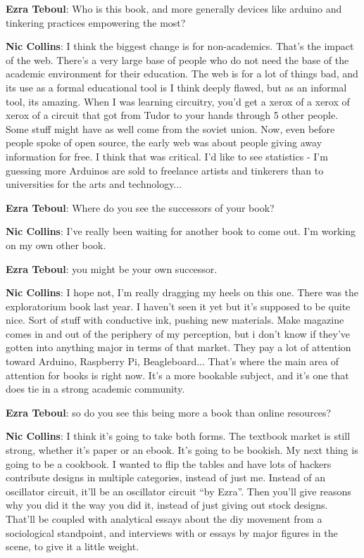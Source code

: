 \textbf{Ezra Teboul}: Who is this book, and more generally devices like arduino and tinkering practices empowering the most?
					
\textbf{Nic Collins}: I think the biggest change is for non-academics. That’s the impact of the web. There’s a very large base of people who do not need the base of the academic environment for their education. The web is for a lot of things bad, and its use as a formal educational tool is I think deeply flawed, but as an informal tool, its amazing. When I was learning circuitry, you’d get a xerox of a xerox of xerox of a circuit that got from Tudor to your hands through 5 other people. Some stuff might have as well come from the soviet union. Now, even before people spoke of open source, the early web was about people giving away information for free. I think that was critical. I’d like to see statistics - I’m guessing more Arduinos are sold to freelance artists and tinkerers than to universities for the arts and technology...
					
\textbf{Ezra Teboul}: Where do you see the successors of your book?
					
\textbf{Nic Collins}: I’ve really been waiting for another book to come out. I’m working on my own other book.

\textbf{Ezra Teboul}: you might be your own successor.
					
\textbf{Nic Collins}: I hope not, I’m really dragging my heels on this one. There was the exploratorium book last year. I haven’t seen it yet but it’s supposed to be quite nice. Sort of stuff with conductive ink, pushing new materials. Make magazine comes in and out of the periphery of my perception, but i don’t know if they’ve gotten into anything major in terms of that market. They pay a lot of attention toward Arduino, Raspberry Pi, Beagleboard... That’s where the main area of attention for books is right now. It’s a more bookable subject, and it’s one that does tie in a strong academic community.
					
\textbf{Ezra Teboul}: so do you see this being more a book than online resources?
					
\textbf{Nic Collins}: I think it’s going to take both forms. The textbook market is still strong, whether it's paper or an ebook. It’s going to be bookish. My next thing is going to be a cookbook. I wanted to flip the tables and have lots of hackers contribute designs in multiple categories, instead of just me. Instead of an oscillator circuit, it’ll be an oscillator circuit ``by Ezra''. Then you’ll give reasons why you did it the way you did it, instead of just giving out stock designs. That’ll be coupled with analytical essays about the diy movement from a sociological standpoint, and interviews with or essays by major figures in the scene, to give it a little weight.
					
